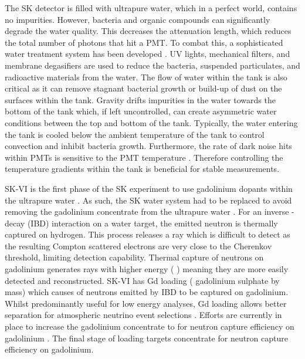 The SK detector is filled with ultrapure water, which in a perfect world, contains no impurities. However, bacteria and organic compounds can significantly degrade the water quality. This decreases the attenuation length, which reduces the total number of photons that hit a PMT. To combat this, a sophisticated water treatment system has been developed \cite{Fukuda2003-ly, Nakano2020-sb}. UV lights, mechanical filters, and membrane degasifiers are used to reduce the bacteria, suspended particulates, and radioactive materials from the water. The flow of water within the tank is also critical as it can remove stagnant bacterial growth or build-up of dust on the surfaces within the tank. Gravity drifts impurities in the water towards the bottom of the tank which, if left uncontrolled, can create asymmetric water conditions between the top and bottom of the tank.
Typically, the water entering the tank is cooled below the ambient temperature of the tank to control convection and inhibit bacteria growth. Furthermore, the rate of dark noise hits within PMTs is sensitive to the PMT temperature \cite{HamamatsuPMT}. Therefore controlling the temperature gradients within the tank is beneficial for stable measurements.

SK-VI is the first phase of the SK experiment to use gadolinium dopants within the ultrapure water \cite{10.5281/zenodo.6694761}. As such, the SK water system had to be replaced to avoid removing the gadolinium concentrate from the ultrapure water \cite{Abe2022-ij}. For an inverse \quickmath{\beta}-decay (IBD) interaction on a water target, the emitted neutron is thermally captured on hydrogen. This process releases a  \quickmath{\gamma} ray which is difficult to detect as the resulting Compton scattered electrons are very close to the Cherenkov threshold, limiting detection capability. Thermal capture of neutrons on gadolinium generates \quickmath{\gamma} rays with higher energy ( \cite{Abe2022-ij}) meaning they are more easily detected and reconstructed. SK-VI has  Gd loading ( gadolinium sulphate by mass) which causes  of neutrons emitted by IBD to be captured on gadolinium\cite{PhysRevLett.93.171101}. Whilst predominantly useful for low energy analyses, Gd loading allows better \quickmath{\nu/\bar{\nu}} separation for atmospheric neutrino event selections \cite{Marti2020-le}. Efforts are currently in place to increase the gadolinium concentrate to  for  neutron capture efficiency on gadolinium \cite{Vagins2022-sj}. The final stage of loading targets  concentrate for  neutron capture efficiency on gadolinium.

